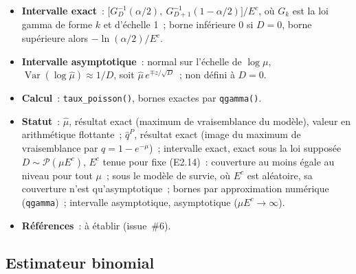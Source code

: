 \documentclass[a4paper,11pt]{article}
\newcommand{\code}[1]{\texttt{\small #1}}
\begin{document}
\begin{itemize}[leftmargin=*, itemsep=2pt]
    il en résulte $E[D - \mu^{*} E^c] = 0$ exactement, avec
    \[
      \mu^{*} = \frac{\mu_d}{m}\, L\, \bigl(e^{m/L} - 1\bigr), \qquad
      \frac{\mu^{*}}{\mu_d} - 1 \approx \frac{m}{2L} .
    \]
    $\hat\mu$ estime donc $\mu^{*}$, et non $\mu_d$~: l'écart relatif, de
    l'ordre de $10^{-5}$ à $5 \cdot 10^{-4}$ pour les forces des constats de
    simulation (section~\ref{sec:constats-brut}), est négligeable devant
    l'erreur d'estimation, mais non nul. Il vaut pour des données réelles
    datées au jour comme pour le simulateur. Le binomial sur une cellule
    observée entière ($E^i = n$) et l'estimateur produit-limite sans sortie
    concurrente n'en sont pas affectés~: leur cible exacte est $q_x$. Avec
    une sortie concurrente, la cible de l'estimateur produit-limite sur la
    grille des jours, $q^{*} = 1 - (1 - h_d)^L$, s'écarte de
    $1 - e^{-\mu_d}$ d'un écart relatif du même ordre (constats,
    section~\ref{sec:constats-brut}).
  \item \textbf{Intervalle exact}~:
    $\bigl[G_D^{-1}(\alpha/2),\ G_{D+1}^{-1}(1 - \alpha/2)\bigr] / E^c$, où
    $G_k$ est la loi gamma de forme $k$ et d'échelle 1~; borne inférieure 0
    si $D = 0$, borne supérieure alors $-\ln(\alpha/2)/E^c$.
  \item \textbf{Intervalle asymptotique}~: normal sur l'échelle de
    $\log\mu$, $\operatorname{Var}(\log\hat\mu) \approx 1/D$, soit
    $\hat\mu\, e^{\mp z/\sqrt{D}}$~; non défini à $D = 0$.
  \item \textbf{Calcul}~: \code{taux\_poisson()}, bornes exactes par
    \code{qgamma()}.
  \item \textbf{Statut}~: $\hat\mu$, résultat exact (maximum de
    vraisemblance du modèle), valeur en arithmétique flottante~; $\hat q^{P}$,
    résultat exact (image du maximum de vraisemblance par
    $q = 1 - e^{-\mu}$)~; intervalle exact, exact sous la loi supposée
    $D \sim \mathcal{P}(\mu E^c)$, $E^c$ tenue pour fixe (E2.14)~: couverture
    au moins égale au niveau pour tout $\mu$~; sous le modèle de survie, où
    $E^c$ est aléatoire, sa couverture n'est qu'asymptotique~; bornes par
    approximation numérique (\code{qgamma})~; intervalle asymptotique,
    asymptotique ($\mu E^c \to \infty$).
  \item \textbf{Références}~: à établir (issue~\#6).
\end{itemize}

\subsection{Estimateur binomial}
\label{sec:brut-binomial}
\end{document}
